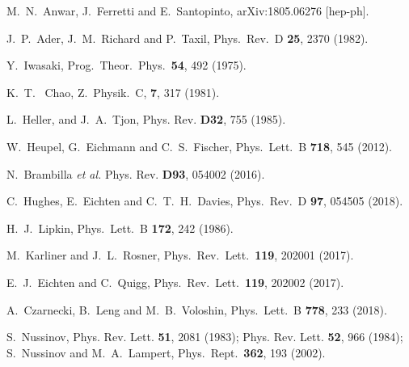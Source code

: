 \documentclass[twocolumn,showpacs,superscriptaddress,preprintnumbers,nofootinbib,prd]{revtex4-1}
\begin{document}
\begin{thebibliography}{}
  M.~N.~Anwar, J.~Ferretti and E.~Santopinto,
  arXiv:1805.06276 [hep-ph].

  J.~P.~Ader, J.~M.~Richard and P.~Taxil,
  Phys.\ Rev.\ D {\bf 25}, 2370 (1982).

  Y.~Iwasaki,
  Prog.\ Theor.\ Phys.\  {\bf 54}, 492 (1975).

  K.~T.~ Chao,
  Z.\ Physik.\ C, {\bf 7}, 317 (1981).

 L.~Heller, and J.~A.~Tjon,
 Phys. Rev. {\bf D32}, 755 (1985).

  W.~Heupel, G.~Eichmann and C.~S.~Fischer,
  Phys.\ Lett.\ B {\bf 718}, 545 (2012).

  N.~Brambilla {\it et al.}
  Phys. Rev. {\bf D93}, 054002 (2016).

  C.~Hughes, E.~Eichten and C.~T.~H.~Davies,
  Phys.\ Rev.\ D {\bf 97}, 054505 (2018).

  H.~J.~Lipkin,
  Phys.\ Lett.\ B {\bf 172}, 242 (1986).

  M.~Karliner and J.~L.~Rosner,
  Phys.\ Rev.\ Lett.\  {\bf 119}, 202001 (2017).

  E.~J.~Eichten and C.~Quigg,
  Phys.\ Rev.\ Lett.\  {\bf 119}, 202002 (2017).

  A.~Czarnecki, B.~Leng and M.~B.~Voloshin,
  Phys.\ Lett.\ B {\bf 778}, 233 (2018).

 S.~Nussinov, %
 Phys. Rev. Lett. {\bfseries 51}, 2081 (1983);
 Phys. Rev. Lett. {\bfseries 52}, 966 (1984);
  S.~Nussinov and M.~A.~Lampert,
  Phys.\ Rept.\  {\bf 362}, 193 (2002).


\end{thebibliography}
\end{document}
